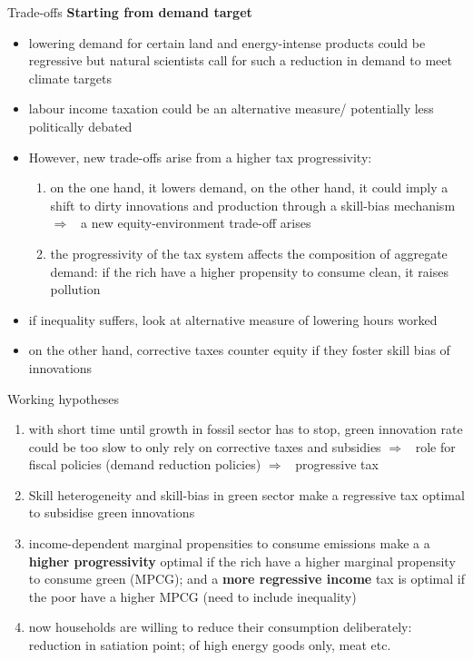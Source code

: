 \documentclass[11pt,aspectratio=169]{beamer}
\newcommand{\ar}{$\Rightarrow$ \ }
\begin{document}
\begin{frame}{Trade-offs}
	\textbf{Starting from demand target}
\begin{itemize}
\item lowering demand for certain land and energy-intense products could be regressive but natural scientists call for such a reduction in demand to meet climate targets
\item labour income taxation could be an alternative measure/ potentially less politically debated
\item However, new trade-offs arise from a higher tax progressivity: 
\begin{enumerate}
	\item on the one hand, it lowers demand, on the other hand, it could imply a shift to dirty innovations and production through a skill-bias mechanism \ar a new equity-environment trade-off arises
	\item the progressivity of the tax system affects the composition of aggregate demand: if the rich have a higher propensity to consume clean, it raises pollution
\end{enumerate}
\item if inequality suffers, look at alternative measure of lowering hours worked
\item on the other hand, corrective taxes counter equity if they foster skill bias of innovations
\end{itemize}
\end{frame}
\begin{frame}{Working hypotheses}	
	\begin{enumerate}
		\item<+-> with short time until growth in fossil sector has to stop, green innovation rate could be too slow to only rely on corrective taxes and subsidies \ar role for fiscal policies (demand reduction policies) \ar progressive tax
		\vspace{3mm}
		\item<+-> Skill heterogeneity and skill-bias in green sector make a regressive tax optimal to subsidise green innovations
		\vspace{3mm}
		\item<+-> income-dependent marginal propensities to consume emissions make a a \textbf{higher progressivity} optimal if the rich have a higher marginal propensity to consume green (MPCG); and a \textbf{more regressive income} tax is optimal if the poor have a higher MPCG (need to include inequality) 
		\vspace{3mm}
		\item<+-> now households are willing to reduce their consumption deliberately: reduction in satiation point; of high energy goods only, meat etc. 
	\end{enumerate}
\end{frame}
\end{document}
